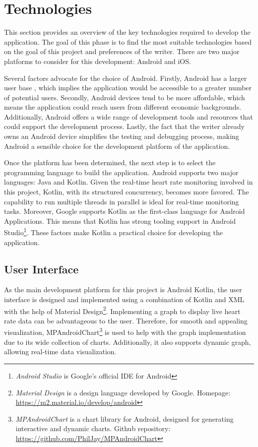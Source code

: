 \section{Technologies}
\label{chap:tech}
This section provides an overview of the key technologies required to develop the application. 
The goal of this phase is to find the most suitable technologies based on the goal of this project and preferences of the writer. 
There are two major platforms to consider for this development: Android and iOS.

Several factors advocate for the choice of Android. 
Firstly, Android has a larger user base \autocite{statcounter_os_market_share}, which implies the application would be accessible to a greater number of potential users. 
Secondly, Android devices tend to be more affordable, which means the application could reach users from different economic backgrounds.
Additionally, Android offers a wide range of development tools and resources that could support the development process.
Lastly, the fact that the writer already owns an Android device simplifies the testing and debugging process, making Android a sensible choice for the development platform of the application.

Once the platform has been determined, the next step is to select the programming language to build the application.
Android supports two major languages: Java and Kotlin. Given the real-time heart rate monitoring involved in this project, Kotlin, with its structured concurrency, becomes more favored. The capability to run multiple threads in parallel is ideal for real-time monitoring tasks.
Moreover, Google supports Kotlin as the first-class language for Android Applications. This means that Kotlin has strong tooling support in Android Studio\footnote{\emph{Android Studio} is Google's official IDE for Android}. \autocite{kotlin_android}
These factors make Kotlin a practical choice for developing the application.

\subsection{User Interface}
As the main development platform for this project is Android Kotlin, the user interface is designed and implemented using a combination of Kotlin and XML with the help of Material Design\footnote{\emph{Material Design} is a design language developed by Google. Homepage: \url{https://m2.material.io/develop/android}}.
Implementing a graph to display live heart rate data can be advantageous to the user. Therefore, for smooth and appealing visualization, MPAndroidChart\footnote{\emph{MPAndroidChart} is a chart library for Android, designed for generating interactive and dynamic charts. Github repository: \url{https://github.com/PhilJay/MPAndroidChart}} is used to help with the graph implementation due to its wide collection of charts. Additionally, it also supports dynamic graph, allowing real-time data visualization.
